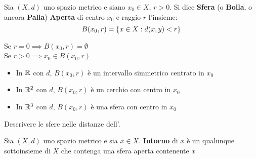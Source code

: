 \begin{definition}
	Sia $(X,d)$ uno spazio metrico e siano $x_0 \in X$, $r > 0$. Si dice \textbf{Sfera} (o \textbf{Bolla}, o ancora \textbf{Palla}) \textbf{Aperta} di centro $x_0$ e raggio $r$ l'insieme:
	\[B(x_0,r)=\left\{x\in X : d(x,y)<r\right\}\]
\end{definition}
\begin{observation}
	Se $r=0 \implies B(x_0,r)=\emptyset$\\
	Se $r>0 \implies x_0\in B(x_0,r)$
\end{observation}
\begin{example}\leavevmode\vspace*{-\baselineskip}
	\begin{itemize}
		\item In $\mathbb{R}$ con $d$, $B(x_0,r)$ è un intervallo simmetrico centrato in $x_0$
		\item In $\mathbb{R}^2$ con $d$, $B(x_0,r)$ è un cerchio con centro in $x_0$
		\item In $\mathbb{R}^3$ con $d$, $B(x_0,r)$ è una sfera con centro in $x_0$
	\end{itemize}
\end{example}
\begin{exercise}
	Descrivere le sfere nelle distanze dell'.
\end{exercise}

\begin{definition}[Intorno]
	Sia $(X,d)$ uno spazio metrico e sia $x \in X$. \textbf{Intorno} di $x$ è un qualunque sottoinsieme di $X$ che contenga una sfera aperta contenente $x$
\end{definition}

